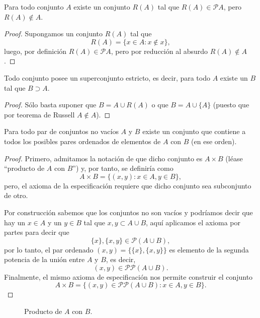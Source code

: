 \documentclass[11pt,oneside,a4paper]{book}
\renewcommand{\P}{\mathcal{P}}
\begin{document}
\begin{prop}
Para todo conjunto $A$ existe un conjunto $R(A)$ tal que $R(A)\in\P A$, pero $R(A)\notin A$.
\end{prop}
\begin{proof}
Supongamos un conjunto $R(A)$ tal que
$$R(A)=\{x\in A:x\notin x\},$$
luego, por definición $R(A)\in\P A$, pero por reducción al absurdo $R(A)\notin A$.
\end{proof}
\begin{cor}
Todo conjunto posee un superconjunto estricto, es decir, para todo $A$ existe un $B$ tal que $B\supset A$.
\end{cor}
\begin{proof}
Sólo basta suponer que $B=A\cup R(A)$ o que $B=A\cup\{A\}$ (puesto que por teorema de Russell $A\notin A$).
\end{proof}

\begin{thm}
Para todo par de conjuntos no vacíos $A$ y $B$ existe un conjunto que contiene a todos los posibles pares ordenados de elementos de $A$ con $B$ (en ese orden).
\end{thm}
\begin{proof}
Primero, admitamos la notación de que dicho conjunto es $A\times B$ (léase ``producto de $A$ con $B$'') y, por tanto, se definiría como
$$A\times B=\{(x,y):x\in A, y\in B\},$$
pero, el axioma de la especificación requiere que dicho conjunto sea subconjunto de otro.

Por construcción sabemos que los conjuntos no son vacíos y podríamos decir que hay un $x\in A$ y un $y\in B$ tal que ${x,y}\subset A\cup B$, aquí aplicamos el axioma por partes para decir que
$$\{x\},\{x,y\}\in\P(A\cup B),$$
por lo tanto, el par ordenado $(x,y)=\{\{x\},\{x,y\}\}$ es elemento de la segunda potencia de la unión entre $A$ y $B$, es decir,
$$(x,y)\in\P\P(A\cup B).$$
Finalmente, el mismo axioma de especificación nos permite construir el conjunto
$$
A\times B=\{(x,y)\in\P\P(A\cup B):x\in A, y\in B\}.
$$
\end{proof}
\begin{figure}
\centering
{}
\caption{Producto de $A$ con $B$.}
\end{figure}
\end{document}
